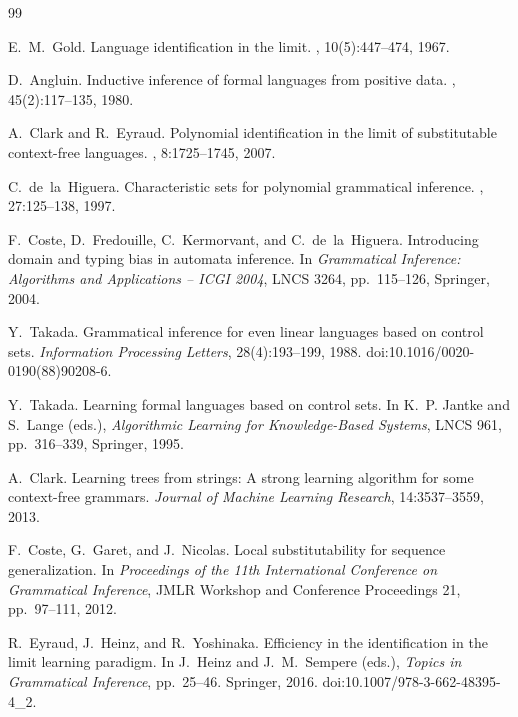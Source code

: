 \begin{thebibliography}{99}

E.~M.~Gold.
\newblock Language identification in the limit.
, 10(5):447--474, 1967.

D.~Angluin.
\newblock Inductive inference of formal languages from positive data.
, 45(2):117--135, 1980.

A.~Clark and R.~Eyraud.
\newblock Polynomial identification in the limit of substitutable context-free
languages.
, 8:1725--1745, 2007.

C.~de~la~Higuera.
\newblock Characteristic sets for polynomial grammatical inference.
, 27:125--138, 1997.

F.~Coste, D.~Fredouille, C.~Kermorvant, and C.~de~la~Higuera.
\newblock Introducing domain and typing bias in automata inference.
\newblock In \emph{Grammatical Inference: Algorithms and Applications -- ICGI 2004},
LNCS 3264, pp.~115--126, Springer, 2004.

Y.~Takada.
\newblock Grammatical inference for even linear languages based on control sets.
\newblock \emph{Information Processing Letters}, 28(4):193--199, 1988.
\newblock doi:10.1016/0020-0190(88)90208-6.

Y.~Takada.
\newblock Learning formal languages based on control sets.
\newblock In K.~P. Jantke and S.~Lange (eds.), \emph{Algorithmic Learning
for Knowledge-Based Systems}, LNCS 961, pp.~316--339, Springer, 1995.

A.~Clark.
\newblock Learning trees from strings: A strong learning algorithm for some context-free grammars.
\newblock \emph{Journal of Machine Learning Research}, 14:3537--3559, 2013.

F.~Coste, G.~Garet, and J.~Nicolas.
\newblock Local substitutability for sequence generalization.
\newblock In {\em Proceedings of the 11th International Conference on
Grammatical Inference}, JMLR Workshop and Conference Proceedings 21,
pp.~97--111, 2012.

R.~Eyraud, J.~Heinz, and R.~Yoshinaka.
\newblock Efficiency in the identification in the limit learning paradigm.
\newblock In J.~Heinz and J.~M.~Sempere (eds.), {\em Topics in Grammatical
Inference}, pp.~25--46. Springer, 2016.
\newblock doi:10.1007/978-3-662-48395-4\_2.


\end{thebibliography}
